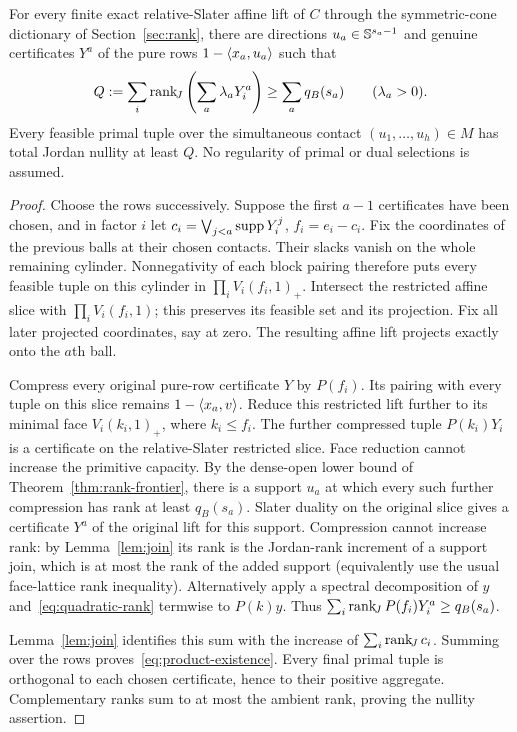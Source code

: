 \begin{theorem}\label{thm:product-existence}
For every finite exact relative-Slater affine lift of $C$ through the
symmetric-cone dictionary of Section~\ref{sec:rank}, there are directions
$u_a\in\mathbb S^{s_a-1}$ and genuine certificates $Y^a$ of the pure rows
$1-\langle x_a,u_a\rangle$ such that
\begin{equation}\label{eq:product-existence}
 Q:=\sum_i\operatorname{rank}_{\!J}\left(\sum_a\lambda_aY_i^a\right)
 \geq\sum_a q_B(s_a)\qquad(\lambda_a>0).
\end{equation}
Every feasible primal tuple over the simultaneous contact
$(u_1,\ldots,u_h)\in M$ has total Jordan nullity at least $Q$. No
regularity of primal or dual selections is assumed.
\end{theorem}
\begin{proof}
Choose the rows successively. Suppose the first $a-1$ certificates have
been chosen, and in factor $i$ let
$c_i=\bigvee_{j<a}\operatorname{supp} Y_i^j$, $f_i=e_i-c_i$. Fix the coordinates of
the previous balls at their chosen contacts. Their slacks vanish on the
whole remaining cylinder. Nonnegativity of each block pairing therefore puts
every feasible tuple on this cylinder in $\prod_i V_i(f_i,1)_+$.
Intersect the restricted affine slice with $\prod_i V_i(f_i,1)$;
this preserves its feasible set and its projection.
Fix all later projected coordinates, say at zero. The resulting affine
lift projects exactly onto the $a$th ball.

Compress every original pure-row certificate $Y$ by $P(f_i)$.
Its pairing with every tuple on this slice remains $1-\langle x_a,v\rangle$.
Reduce this restricted lift further to its minimal face $V_i(k_i,1)_+$,
where $k_i\leq f_i$. The further compressed tuple $P(k_i)Y_i$ is a
certificate on the relative-Slater restricted slice. Face reduction
cannot increase the primitive capacity. By the dense-open lower bound of
Theorem~\ref{thm:rank-frontier}, there is a support $u_a$ at which every
such further compression has rank at least $q_B(s_a)$. Slater duality on the
original slice gives a certificate $Y^a$ of the original lift for this
support. Compression cannot increase rank: by
Lemma~\ref{lem:join}
its rank is the Jordan-rank increment of a support join, which is at most
the rank of the added support (equivalently use the usual face-lattice
rank inequality). Alternatively apply a spectral decomposition of $y$
and~\eqref{eq:quadratic-rank} termwise to $P(k)y$.
Thus $\sum_i\operatorname{rank}_{\!J} P(f_i)Y_i^a\geq q_B(s_a)$.

Lemma~\ref{lem:join} identifies this sum with the increase of
$\sum_i\operatorname{rank}_{\!J} c_i$. Summing over the rows proves~\eqref{eq:product-existence}.
Every final primal tuple is orthogonal to each chosen certificate, hence
to their positive aggregate. Complementary ranks sum to at most the
ambient rank, proving the nullity assertion.
\end{proof}

